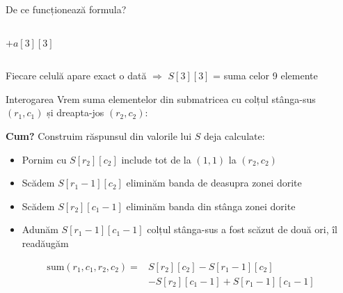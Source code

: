 ﻿\documentclass{beamer}
\begin{document}
\begin{frame}{De ce funcționează formula?}
\begin{columns}[c]
    \centering
    {\footnotesize $+a[3][3]$}
    \begin{center}
    \end{center}
  \end{columns}

  \vfill
  \begin{center}
    \small Fiecare celulă apare exact o dată $\Rightarrow$ $S[3][3]$ = suma celor 9 elemente \checkmark
  \end{center}
\end{frame}

\begin{frame}[shrink]{Interogarea}
  Vrem suma elementelor din submatricea cu colțul stânga-sus $(r_1,c_1)$ și dreapta-jos $(r_2,c_2)$:

  \smallskip
  \textbf{Cum?} Construim răspunsul din valorile lui $S$ deja calculate:
  \begin{itemize}
    \item Pornim cu $S[r_2][c_2]$ \textemdash{} include tot de la $(1,1)$ la $(r_2,c_2)$
    \item Scădem $S[r_1{-}1][c_2]$ \textemdash{} eliminăm banda de deasupra zonei dorite
    \item Scădem $S[r_2][c_1{-}1]$ \textemdash{} eliminăm banda din stânga zonei dorite
    \item Adunăm $S[r_1{-}1][c_1{-}1]$ \textemdash{} colțul stânga-sus a fost scăzut de două ori, îl readăugăm
  \end{itemize}

  \begin{align*}
    \mathrm{sum}(r_1,c_1,r_2,c_2) = {}&S[r_2][c_2] - S[r_1{-}1][c_2]\\
    &- S[r_2][c_1{-}1] + S[r_1{-}1][c_1{-}1]
  \end{align*}
\end{frame}
\end{document}
